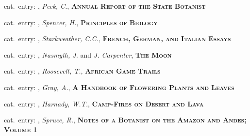 \vbox{%
  \vspace*{0.5 cm}
  \noindent
  {\footnotesize{}\hspace{1em}cat.~entry: , \textit{Peck, C.}, \textsc{\bfseries Annual Report of the State Botanist}}
}

\vbox{%
  \vspace*{0.5 cm}
  \noindent
  {\footnotesize{}\hspace{1em}cat.~entry: , \textit{Spencer, H.}, \textsc{\bfseries Principles of Biology}}
}

\vbox{%
  \vspace*{0.5 cm}
  \noindent
  {\footnotesize{}\hspace{1em}cat.~entry: , \textit{Starkweather, C.C.}, \textsc{\bfseries French, German, and Italian Essays}}
}

\vbox{%
  \vspace*{0.5 cm}
  \noindent
  {\footnotesize{}\hspace{1em}cat.~entry: , \textit{Nasmyth, J.} and \textit{J. Carpenter}, \textsc{\bfseries The Moon}}
}

\vbox{%
  \vspace*{0.5 cm}
  \noindent
  {\footnotesize{}\hspace{1em}cat.~entry: , \textit{Roosevelt, T.}, \textsc{\bfseries African Game Trails}}
}

\vbox{%
  \vspace*{0.5 cm}
  \noindent
  {\footnotesize{}\hspace{1em}cat.~entry: , \textit{Gray, A.}, \textsc{\bfseries A Handbook of Flowering Plants and Leaves}}
}

\vbox{%
  \vspace*{0.5 cm}
  \noindent
  {\footnotesize{}\hspace{1em}cat.~entry: , \textit{Harnady, W.T.}, \textsc{\bfseries Camp-Fires on Desert and Lava}}
}

\vbox{%
  \vspace*{0.5 cm}
  \noindent
  {\footnotesize{}\hspace{1em}cat.~entry: , \textit{Spruce, R.}, \textsc{\bfseries Notes of a Botanist on the Amazon and Andes; Volume 1}}
}

